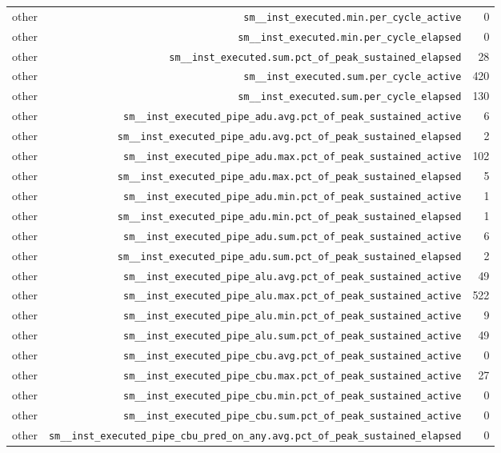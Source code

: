 \begin{table}[h]
\begin{tabular}{|l|r|r|}
other & \texttt{sm__inst_executed.min.per_cycle_active} & 0 \\
other & \texttt{sm__inst_executed.min.per_cycle_elapsed} & 0 \\
other & \texttt{sm__inst_executed.sum.pct_of_peak_sustained_elapsed} & 28 \\
other & \texttt{sm__inst_executed.sum.per_cycle_active} & 420 \\
other & \texttt{sm__inst_executed.sum.per_cycle_elapsed} & 130 \\
other & \texttt{sm__inst_executed_pipe_adu.avg.pct_of_peak_sustained_active} & 6 \\
other & \texttt{sm__inst_executed_pipe_adu.avg.pct_of_peak_sustained_elapsed} & 2 \\
other & \texttt{sm__inst_executed_pipe_adu.max.pct_of_peak_sustained_active} & 102 \\
other & \texttt{sm__inst_executed_pipe_adu.max.pct_of_peak_sustained_elapsed} & 5 \\
other & \texttt{sm__inst_executed_pipe_adu.min.pct_of_peak_sustained_active} & 1 \\
other & \texttt{sm__inst_executed_pipe_adu.min.pct_of_peak_sustained_elapsed} & 1 \\
other & \texttt{sm__inst_executed_pipe_adu.sum.pct_of_peak_sustained_active} & 6 \\
other & \texttt{sm__inst_executed_pipe_adu.sum.pct_of_peak_sustained_elapsed} & 2 \\
other & \texttt{sm__inst_executed_pipe_alu.avg.pct_of_peak_sustained_active} & 49 \\
other & \texttt{sm__inst_executed_pipe_alu.max.pct_of_peak_sustained_active} & 522 \\
other & \texttt{sm__inst_executed_pipe_alu.min.pct_of_peak_sustained_active} & 9 \\
other & \texttt{sm__inst_executed_pipe_alu.sum.pct_of_peak_sustained_active} & 49 \\
other & \texttt{sm__inst_executed_pipe_cbu.avg.pct_of_peak_sustained_active} & 0 \\
other & \texttt{sm__inst_executed_pipe_cbu.max.pct_of_peak_sustained_active} & 27 \\
other & \texttt{sm__inst_executed_pipe_cbu.min.pct_of_peak_sustained_active} & 0 \\
other & \texttt{sm__inst_executed_pipe_cbu.sum.pct_of_peak_sustained_active} & 0 \\
other & \texttt{sm__inst_executed_pipe_cbu_pred_on_any.avg.pct_of_peak_sustained_elapsed} & 0 \\

\end{tabular}
\end{table}
